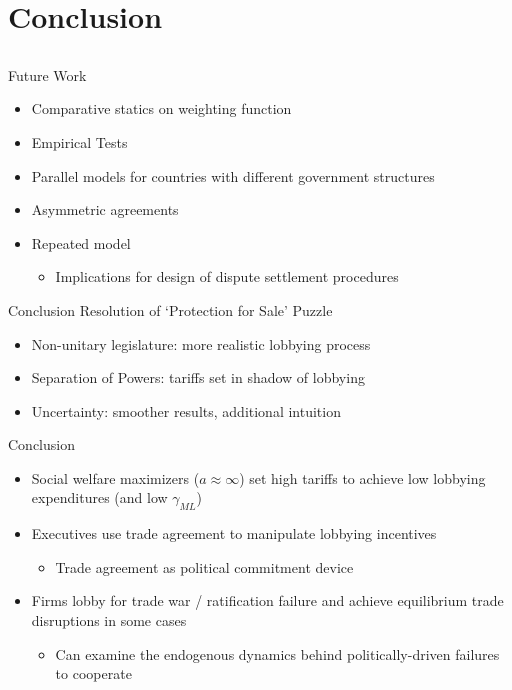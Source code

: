 \documentclass[handout]{beamer}
\newcommand{\ga}{\gamma}
\begin{document}
\section{Conclusion}
\subsection{}
\begin{frame}{Future Work}
\begin{itemize}[<+->]
	\item Comparative statics on weighting function
	\item Empirical Tests
	\item Parallel models for countries with different government structures
	\item Asymmetric agreements
	\item Repeated model
		\begin{itemize}
			\item Implications for design of dispute settlement procedures
		\end{itemize}
\end{itemize}
\end{frame}


\begin{frame}{Conclusion}
Resolution of `Protection for Sale' Puzzle
\pause
\begin{itemize}[<+->]
	\item Non-unitary legislature: more realistic lobbying process
	\item Separation of Powers: tariffs set in shadow of lobbying
	\item Uncertainty: smoother results, additional intuition
\end{itemize}
\end{frame}


\begin{frame}{Conclusion}
\begin{itemize}[<+->]
	\item Social welfare maximizers ($a \approx \infty$) set high tariffs to achieve low lobbying expenditures (and low $\ga_{ML}$) 
	\item Executives use trade agreement to manipulate lobbying incentives
		\begin{itemize}
			\item Trade agreement as political commitment device
		\end{itemize}
	\item Firms lobby for trade war / ratification failure and achieve equilibrium trade disruptions in some cases
		\begin{itemize}
			\item Can examine the endogenous dynamics behind politically-driven failures to cooperate
		\end{itemize}
\end{itemize}

\end{frame}
\end{document}
